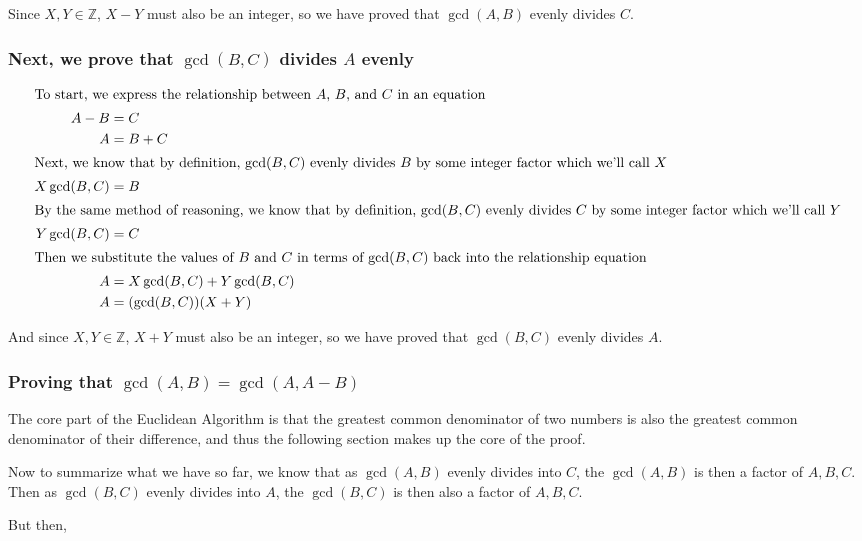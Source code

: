 \documentclass[index]{subfiles}
\begin{document}
Since \(X,Y\in\mathbb{Z}\), \(X-Y\) must also be an integer, so we have proved that \(\gcd(A,B)\) evenly divides \(C\).

\subsubsection{\texorpdfstring{Next, we prove that \(\gcd(B,C)\) divides \(A\) evenly}{Lg}}

\begin{align}
    \intertext{To start, we express the relationship between \(A\), \(B\), and \(C\) in an equation}
    A-B        & =C                       \\
    A          & =B+C                     \\
    \intertext{Next, we know that by definition, \(\gcd(B,C)\) evenly divides \(B\) by some integer factor which we'll call \(X\)}
    X\gcd(B,C) & =B                       \\
    \intertext{By the same method of reasoning, we know that by definition, \(\gcd(B,C)\) evenly divides \(C\) by some integer factor which we'll call \(Y\)}
    Y\gcd(B,C) & =C                       \\
    \intertext{Then we substitute the values of \(B\) and \(C\) in terms of \(\gcd(B,C)\) back into the relationship equation}
    A          & =X\gcd(B,C) + Y\gcd(B,C) \\
    A          & =(\gcd(B,C))(X+Y)
\end{align}

And since \(X,Y\in\mathbb{Z}\), \(X+Y\) must also be an integer, so we have proved that \(\gcd(B,C)\) evenly divides \(A\).

\subsubsection{\texorpdfstring{Proving that \(\gcd(A,B)=\gcd(A, A-B)\)}{Lg}}

The core part of the Euclidean Algorithm is that the greatest common denominator of two numbers is also the greatest common denominator of their difference, and thus the following section makes up the core of the proof.

Now to summarize what we have so far, we know that as \(\gcd(A,B)\) evenly divides into \(C\), the \(\gcd(A,B)\) is then a factor of \(A,B,C\). Then as \(\gcd(B,C)\) evenly divides into \(A\), the \(\gcd(B,C)\) is then also a factor of \(A,B,C\).

But then,
\end{document}
